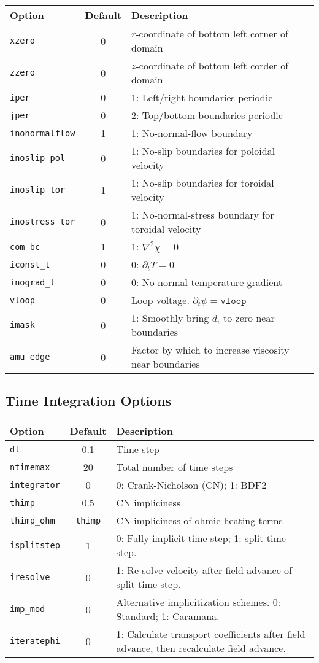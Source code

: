 \documentclass[letterpaper]{book}
\begin{document}
\begin{tabular}{lcp{2.5in}}
  \textbf{Option} & \textbf{Default} & \textbf{Description}\\
  \hline
  \texttt{xzero}  & 0 & $r$-coordinate of bottom left corner of domain\\
  \texttt{zzero}  & 0 & $z$-coordinate of bottom left corder of domain\\
  \texttt{iper}   & 0 & 1: Left/right boundaries periodic\\
  \texttt{jper}   & 0 & 2: Top/bottom boundaries periodic\\
  \texttt{inonormalflow}& 1 & 1: No-normal-flow boundary\\
  \texttt{inoslip\_pol} & 0 & 1: No-slip boundaries for poloidal velocity\\
  \texttt{inoslip\_tor} & 1 & 1: No-slip boundaries for toroidal velocity\\
  \texttt{inostress\_tor}&0 & 1: No-normal-stress boundary for toroidal 
                                 velocity\\
  \texttt{com\_bc}& 1 & 1: $\nabla^2 \chi = 0$\\
  \texttt{iconst\_t}  & 0 & 0: $\partial_t T = 0$\\
  \texttt{inograd\_t} & 0 & 0: No normal temperature gradient\\
  \texttt{vloop}  & 0 & Loop voltage.  $\partial_t \psi = \mathtt{vloop}$\\
  \texttt{imask}  & 0 & 1: Smoothly bring $d_i$ to zero near
    boundaries\\
  \texttt{amu\_edge} & 0 &    Factor by which to increase viscosity near 
                              boundaries
\end{tabular}


\subsection{Time Integration Options}
\begin{tabular}{lcp{3in}}
  \textbf{Option}&\textbf{Default}&\textbf{Description}\\
  \hline
  \texttt{dt}         & 0.1 & Time step\\
  \texttt{ntimemax}   & 20  & Total number of time steps\\
  \texttt{integrator} & 0   & 0: Crank-Nicholson (CN); 1: BDF2\\
  \texttt{thimp}      & 0.5 & CN impliciness\\
  \texttt{thimp\_ohm} & \texttt{thimp} & 
                              CN impliciness of ohmic heating terms\\
  \texttt{isplitstep} & 1   & 0: Fully implicit time step; 
                              1: split time step.\\
  \texttt{iresolve}   & 0   & 1: Re-solve velocity after 
                              field advance of split time step.\\
  \texttt{imp\_mod}   & 0   & Alternative implicitization
    schemes. 0: Standard; 1: Caramana.\\
  \texttt{iteratephi} & 0   & 1: Calculate transport coefficients after
    field advance, then recalculate field advance.
\end{tabular}
\end{document}
